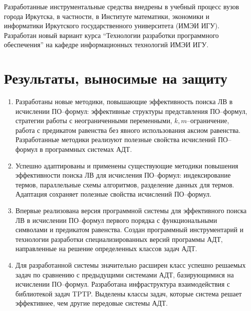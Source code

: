 Разработанные инструментальные средства внедрены в учебный процесс вузов города Иркутска, в частности, в Институте математики, экономики и информатики Иркутского государственного университета (ИМЭИ ИГУ). Разработан новый вариант курса ``Технологии разработки программного обеспечения'' на кафедре информационных технологий ИМЭИ ИГУ.



\section*{Результаты, выносимые на защиту}
\begin{enumerate}

\item Разработаны новые методики, повышающие эффективность поиска ЛВ в исчислении ПО--формул: эффективные структуры представления ПО--формул, стратегии работы с неограниченными переменными, $k,m$--ограничение, работа с предикатом равенства без явного использования аксиом равенства. Разработанные методики реализуют полезные свойства исчислений ПО--формул в программных системах АДТ.

\item Успешно адаптированы и применены существующие методики повышения эффективности поиска ЛВ для исчисления ПО--формул: индексирование термов, параллельные схемы алгоритмов, разделение данных для термов. Адаптация сохраняет полезные свойства исчислений ПО--формул.

\item Впервые реализована версия программной системы для эффективного поиска ЛВ в исчислении ПО--формул первого порядка с функциональными символами и предикатом равенства. Создан программный инструментарий и технологии разработки специализированных версий программы АДТ, направленные на решение определенных классов задач АДТ.

\item Для разработанной системы значительно расширен класс успешно решаемых задач по сравнению с предыдущими системами АДТ, базирующимися на исчислении ПО--формул. Разработана инфраструктура взаимодействия с библиотекой задач TPTP. Выделены классы задач, которые система решает эффективнее, чем другие передовые системы АДТ.
\end{enumerate}



